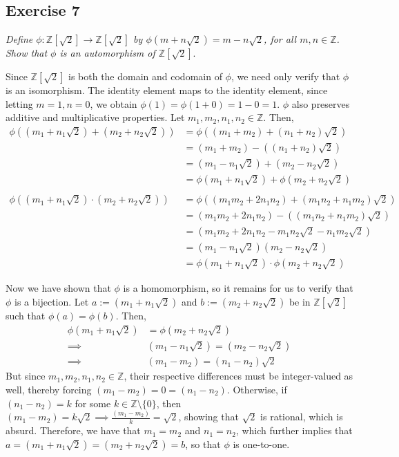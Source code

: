 \subsection*{Exercise 7}
\textit{Define $\phi: \mathbb{Z}[\sqrt{2}] \rightarrow \mathbb{Z}[\sqrt{2}]$ by $\phi(m + n\sqrt{2}) = m - n\sqrt{2}$, for all $m,n \in \mathbb{Z}$. Show that $\phi$ is an automorphism of $\mathbb{Z}[\sqrt{2}].$}

\vspace{5 mm}
Since $\mathbb{Z}[\sqrt{2}]$ is both the domain and codomain of $\phi$, we need only verify that $\phi$ is an isomorphism. The identity element maps to the identity element, since letting $m = 1, n = 0$, we obtain $\phi(1) = \phi(1 + 0) = 1 - 0 = 1$. $\phi$ also preserves additive and multiplicative properties. Let $m_1,m_2,n_1,n_2 \in \mathbb{Z}$. Then,
\begin{align*}
    \phi((m_1 + n_1\sqrt{2}) + (m_2 + n_2\sqrt{2})) &= \phi((m_1 + m_2) + (n_1 + n_2)\sqrt{2}) \\
    &= (m_1 + m_2) - ((n_1 + n_2)\sqrt{2}) \\
    &= (m_1 - n_1\sqrt{2}) + (m_2 - n_2\sqrt{2}) \\
    &= \phi(m_1 + n_1\sqrt{2}) + \phi(m_2 + n_2\sqrt{2}) \\
    & \\
    \phi((m_1 + n_1\sqrt{2}) \cdot (m_2 + n_2\sqrt{2})) &= \phi((m_1m_2 + 2n_1n_2) + (m_1n_2 + n_1m_2)\sqrt{2}) \\
    &= (m_1m_2 + 2n_1n_2) - ((m_1n_2 + n_1m_2)\sqrt{2}) \\
    &= (m_1m_2 + 2n_1n_2 - m_1n_2\sqrt{2} - n_1m_2\sqrt{2}) \\
    &= (m_1 - n_1\sqrt{2})(m_2 - n_2\sqrt{2}) \\
    &= \phi(m_1 + n_1\sqrt{2})\cdot \phi(m_2 + n_2\sqrt{2})
\end{align*}

Now we have shown that $\phi$ is a homomorphism, so it remains for us to verify that $\phi$ is a bijection. Let $a := (m_1 + n_1\sqrt{2})$ and $b := (m_2 + n_2\sqrt{2})$ be in $\mathbb{Z}[\sqrt{2}]$ such that $\phi(a) = \phi(b)$. Then, 
\begin{align*}
    \phi(m_1 + n_1\sqrt{2}) &= \phi(m_2 + n_2\sqrt{2}) \\ \implies & (m_1 - n_1\sqrt{2}) = (m_2 - n_2\sqrt{2}) \\
    \implies & (m_1 - m_2) = (n_1 - n_2)\sqrt{2}
\end{align*}
But since $m_1,m_2,n_1,n_2 \in \mathbb{Z}$, their respective differences must be integer-valued as well, thereby forcing $(m_1-m_2) = 0 = (n_1 - n_2)$. Otherwise, if $(n_1 - n_2) = k$ for some $k \in \mathbb{Z} \setminus \{0\}$, then $(m_1 - m_2) = k\sqrt{2} \implies \frac{(m_1 - m_2)}{k} = \sqrt{2}$, showing that $\sqrt{2}$ is rational, which is absurd. Therefore, we have that $m_1 = m_2$ and $n_1 = n_2$, which further implies that $a = (m_1 + n_1\sqrt{2}) = (m_2 + n_2\sqrt{2}) = b$, so that $\phi$ is one-to-one. 

